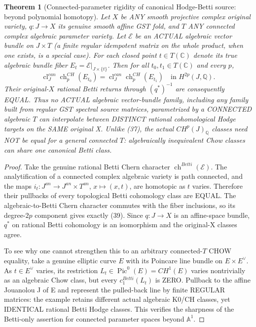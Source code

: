 \documentclass[11pt]{article}
\newtheorem{theorem}{Theorem}[section]
\begin{document}
\begin{theorem}[Connected-parameter rigidity of canonical Hodge-Betti source: beyond polynomial homotopy]
Let $X$ be ANY smooth projective complex original variety,
$q:J\to X$ its genuine smooth affine GST fold, and
$T$ ANY connected complex algebraic parameter variety.
Let $\mathcal E$ be an ACTUAL algebraic vector
bundle on $J\times T$ (a finite regular
idempotent matrix on the whole product,
when one exists, is a special case).
For each closed point $t\in T(\mathbb C)$
denote its true algebraic bundle fiber
$E_t=\mathcal E|_{J\times\{t\}}$.
Then for all $t_0,t_1\in T(\mathbb C)$
and every $p$,
\[
\boxed{\operatorname{cl}^{can}_J\operatorname{ch}^{CH}_p(E_{t_0})
       =\operatorname{cl}^{can}_J\operatorname{ch}^{CH}_p(E_{t_1})
       \quad\text{in }H^{2p}(J,\mathbb Q).}                  \tag{39}
\]
Their original-$X$ rational Betti returns through
$(q^*)^{-1}$ are consequently EQUAL.
Thus no ACTUAL algebraic vector-bundle family,
including any family built from regular GST
spectral source matrices, parametrized by a
CONNECTED algebraic $T$ can interpolate between
DISTINCT rational cohomological Hodge targets
on the SAME original X.
Unlike (37), the actual $CH^p(J)_{\mathbb Q}$
classes need NOT be equal for a general connected
$T$: algebraically inequivalent Chow classes
can share one canonical Betti class.
\end{theorem}
\begin{proof}
Take the genuine rational
Betti Chern character
$\operatorname{ch}^{Betti}(\mathcal E)$.
The analytification of a connected complex
algebraic variety is path connected,
and the maps
$i_t:J^{an}\to J^{an}\times T^{an}$,
$x\mapsto(x,t)$, are homotopic as $t$ varies.
Therefore their pullbacks of every
topological Betti cohomology class are EQUAL.
The algebraic-to-Betti Chern character
commutes with the fiber inclusions, so its
degree-$2p$ component gives exactly (39).
Since $q:J\to X$ is an affine-space bundle,
$q^*$ on rational Betti cohomology is an
isomorphism and the original-X classes agree.

To see why one cannot strengthen this to an
arbitrary connected-$T$ CHOW equality,
take a genuine elliptic curve $E$ with its
Poincare line bundle on $E\times E^\vee$.
As $t\in E^\vee$ varies, its restriction
$L_t\in\operatorname{Pic}^0(E)=CH^1(E)$
varies nontrivially as an algebraic Chow
class, but every $c_1^{Betti}(L_t)$ is ZERO.
Pullback to the affine Jouanolou J of E
and represent the pulled-back line by
finite REGULAR matrices: the example retains
different actual algebraic K0/CH classes,
yet IDENTICAL rational Betti Hodge classes.
This verifies the sharpness of the
Betti-only assertion for connected parameter
spaces beyond $\mathbb A^1$.
\end{proof}
\end{document}
